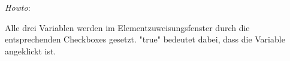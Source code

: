 \emph{Howto}:

Alle drei Variablen werden im Elementzuweisungsfenster durch die entsprechenden
Checkboxes gesetzt. "true" bedeutet dabei, dass die Variable angeklickt ist.